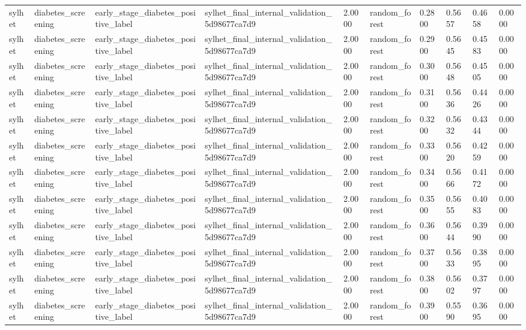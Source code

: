 \begin{tabular}{llllllllll}
sylhet & diabetes\_screening & early\_stage\_diabetes\_positive\_label & sylhet\_final\_internal\_validation\_5d98677ca7d9 & 2.0000 & random\_forest & 0.2800 & 0.5657 & 0.4658 & 0.0000 \\
sylhet & diabetes\_screening & early\_stage\_diabetes\_positive\_label & sylhet\_final\_internal\_validation\_5d98677ca7d9 & 2.0000 & random\_forest & 0.2900 & 0.5645 & 0.4583 & 0.0000 \\
sylhet & diabetes\_screening & early\_stage\_diabetes\_positive\_label & sylhet\_final\_internal\_validation\_5d98677ca7d9 & 2.0000 & random\_forest & 0.3000 & 0.5648 & 0.4505 & 0.0000 \\
sylhet & diabetes\_screening & early\_stage\_diabetes\_positive\_label & sylhet\_final\_internal\_validation\_5d98677ca7d9 & 2.0000 & random\_forest & 0.3100 & 0.5636 & 0.4426 & 0.0000 \\
sylhet & diabetes\_screening & early\_stage\_diabetes\_positive\_label & sylhet\_final\_internal\_validation\_5d98677ca7d9 & 2.0000 & random\_forest & 0.3200 & 0.5632 & 0.4344 & 0.0000 \\
sylhet & diabetes\_screening & early\_stage\_diabetes\_positive\_label & sylhet\_final\_internal\_validation\_5d98677ca7d9 & 2.0000 & random\_forest & 0.3300 & 0.5620 & 0.4259 & 0.0000 \\
sylhet & diabetes\_screening & early\_stage\_diabetes\_positive\_label & sylhet\_final\_internal\_validation\_5d98677ca7d9 & 2.0000 & random\_forest & 0.3400 & 0.5666 & 0.4172 & 0.0000 \\
sylhet & diabetes\_screening & early\_stage\_diabetes\_positive\_label & sylhet\_final\_internal\_validation\_5d98677ca7d9 & 2.0000 & random\_forest & 0.3500 & 0.5655 & 0.4083 & 0.0000 \\
sylhet & diabetes\_screening & early\_stage\_diabetes\_positive\_label & sylhet\_final\_internal\_validation\_5d98677ca7d9 & 2.0000 & random\_forest & 0.3600 & 0.5644 & 0.3990 & 0.0000 \\
sylhet & diabetes\_screening & early\_stage\_diabetes\_positive\_label & sylhet\_final\_internal\_validation\_5d98677ca7d9 & 2.0000 & random\_forest & 0.3700 & 0.5633 & 0.3895 & 0.0000 \\
sylhet & diabetes\_screening & early\_stage\_diabetes\_positive\_label & sylhet\_final\_internal\_validation\_5d98677ca7d9 & 2.0000 & random\_forest & 0.3800 & 0.5602 & 0.3797 & 0.0000 \\
sylhet & diabetes\_screening & early\_stage\_diabetes\_positive\_label & sylhet\_final\_internal\_validation\_5d98677ca7d9 & 2.0000 & random\_forest & 0.3900 & 0.5590 & 0.3695 & 0.0000 \\

\end{tabular}
